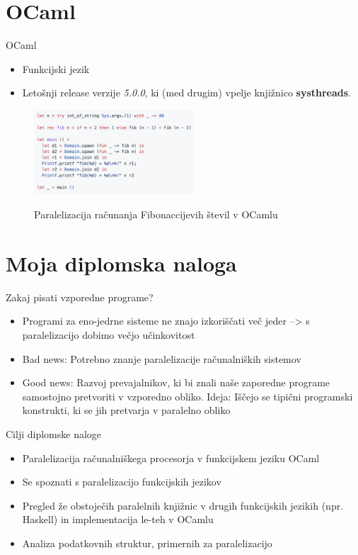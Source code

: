 \documentclass{beamer}
\begin{document}
\section{OCaml}

\begin{frame}{OCaml}
    \begin{itemize}
        \item Funkcijski jezik
        \item Leto\v snji release verzije \textit{5.0.0}, ki (med drugim) vpelje knji\v znico \textbf{systhreads}.
    \end{itemize}
    
    \begin{figure}
    \caption{Paralelizacija ra\v cunanja Fibonaccijevih \v stevil v OCamlu}
    \includegraphics[width=6cm]{slike/OCaml-primer.png}
    \label{fig:OCaml-fibonacci}
    \end{figure}

\end{frame}


\section{Moja diplomska naloga}

\begin{frame}{Zakaj pisati vzporedne programe?}
    \begin{itemize}
        \item Programi za eno-jedrne sisteme ne znajo izkori\v s\v cati ve\v c jeder --> s paralelizacijo dobimo ve\v cjo u\v cinkovitost
        \item Bad news: Potrebno znanje paralelizacije ra\v cunalni\v skih sistemov
        \item Good news: Razvoj prevajalnikov, ki bi znali na\v se zaporedne programe samostojno pretvoriti v vzporedno obliko. Ideja: I\v s\v cejo se tipi\v cni programski konstrukti, ki se jih pretvarja v paralelno obliko
    \end{itemize}
\end{frame}

\begin{frame}{Cilji diplomske naloge}
    \begin{itemize}
        \item Paralelizacija ra\v cunalni\v skega procesorja v funkcijskem jeziku OCaml
        \item Se spoznati s paralelizacijo funkcijskih jezikov
        \item Pregled \v ze obstoje\v cih paralelnih knji\v znic v drugih funkcijskih jezikih (npr. Haskell) in implementacija le-teh v OCamlu
        \item Analiza podatkovnih struktur, primernih za paralelizacijo
    \end{itemize}
    
\end{frame}
\end{document}
